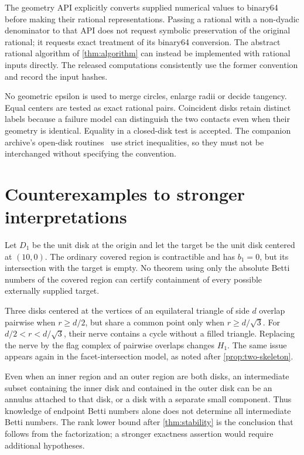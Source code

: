 The geometry API explicitly converts supplied numerical values to binary64 before making their rational representations. Passing a rational with a non-dyadic denominator to that API does not request symbolic preservation of the original rational; it requests exact treatment of its binary64 conversion. The abstract rational algorithm of \cref{thm:algorithm} can instead be implemented with rational inputs directly. The released computations consistently use the former convention and record the input hashes.

No geometric epsilon is used to merge circles, enlarge radii or decide tangency. Equal centers are tested as exact rational pairs. Coincident disks retain distinct labels because a failure model can distinguish the two contacts even when their geometry is identical. Equality in a closed-disk test is accepted. The companion archive's open-disk routines~\cite{ecog} use strict inequalities, so they must not be interchanged without specifying the convention.

\section{Counterexamples to stronger interpretations}
\label{app:counterexamples}
\begin{example}
Let $D_1$ be the unit disk at the origin and let the target be the unit disk centered at $(10,0)$. The ordinary covered region is contractible and has $b_1=0$, but its intersection with the target is empty. No theorem using only the absolute Betti numbers of the covered region can certify containment of every possible externally supplied target.
\end{example}

\begin{example}
Three disks centered at the vertices of an equilateral triangle of side $d$ overlap pairwise when $r\ge d/2$, but share a common point only when $r\ge d/\sqrt3$. For $d/2<r<d/\sqrt3$, their nerve contains a cycle without a filled triangle. Replacing the nerve by the flag complex of pairwise overlaps changes $H_1$. The same issue appears again in the facet-intersection model, as noted after \cref{prop:two-skeleton}.
\end{example}

\begin{example}
Even when an inner region and an outer region are both disks, an intermediate subset containing the inner disk and contained in the outer disk can be an annulus attached to that disk, or a disk with a separate small component. Thus knowledge of endpoint Betti numbers alone does not determine all intermediate Betti numbers. The rank lower bound after \cref{thm:stability} is the conclusion that follows from the factorization; a stronger exactness assertion would require additional hypotheses.
\end{example}

